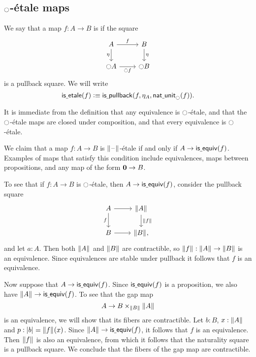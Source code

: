 \subsection{\texorpdfstring{${\ocircle}$}{○}-\'etale maps}

\begin{defn}
We say that a map $f:A\to B$ is  if the square
\begin{equation*}
\begin{tikzcd}
A \arrow[r,"f"] \arrow[d,swap,"\eta"] & B \arrow[d,"\eta"] \\
\modal A \arrow[r,swap,"\modal f"] & \modal B
\end{tikzcd}
\end{equation*}
is a pullback square. We will write
\begin{equation*}
\mathsf{is\underline{\ }{}etale}(f)\vcentcolon\equiv\mathsf{is\underline{\ }{}pullback}(f,\eta_A,\mathsf{nat\underline{\ }{}unit}_{\ocircle}(f)).
\end{equation*}
\end{defn}

It is immediate from the definition that any equivalence is ${\ocircle}$-\'etale, and that the ${\ocircle}$-\'etale maps are closed under composition, and that every equivalence is ${\ocircle}$-\'etale.

\begin{eg}\label{eg:etale_prop}
We claim that a map $f:A\to B$ is $\Vert \mathord{\hspace{1pt}\text{--}\hspace{1pt}}\Vert_{}$-\'etale if and only if $A\to \mathsf{is\underline{\ }{}equiv}(f)$. Examples of maps that satisfy this condition include equivalences, maps between propositions, and any map of the form $\mathbf{0}\to B$.

To see that if $f:A\to B$ is ${\ocircle}$-\'etale, then $A\to\mathsf{is\underline{\ }{}equiv}(f)$, consider the pullback square
\begin{equation*}
\begin{tikzcd}
A \arrow[r] \arrow[d,swap,"f"] & \brck{A} \arrow[d,"\brck{f}"] \\
B \arrow[r] & \brck{B},
\end{tikzcd}
\end{equation*}
and let $a:A$. Then both $\Vert A\Vert_{}$ and $\Vert B\Vert_{}$ are contractible, so $\Vert f\Vert_{}:\Vert A\Vert_{}\to\Vert B\Vert_{}$ is an equivalence. Since equivalences are stable under pullback it follows that $f$ is an equivalence.

Now suppose that $A\to \mathsf{is\underline{\ }{}equiv}(f)$. Since $\mathsf{is\underline{\ }{}equiv}(f)$ is a proposition, we also have $\Vert A\Vert_{}\to\mathsf{is\underline{\ }{}equiv}(f)$. To see that the gap map
\begin{equation*}
A \to B\times_{\Vert B\Vert_{}}\Vert A\Vert_{}
\end{equation*}
is an equivalence, we will show that its fibers are contractible. Let $b:B$, $x:\Vert A\Vert_{}$ and $p:\mathopen{}\left|b\right|_{}^{}\mathclose{}=\Vert f\Vert_{}(x)$. Since $\Vert A\Vert_{}\to\mathsf{is\underline{\ }{}equiv}(f)$, it follows that $f$ is an equivalence. Then $\Vert f\Vert_{}$ is also an equivalence, from which it follows that the naturality square is a pullback square. We conclude that the fibers of the gap map are contractible. 
\end{eg}


